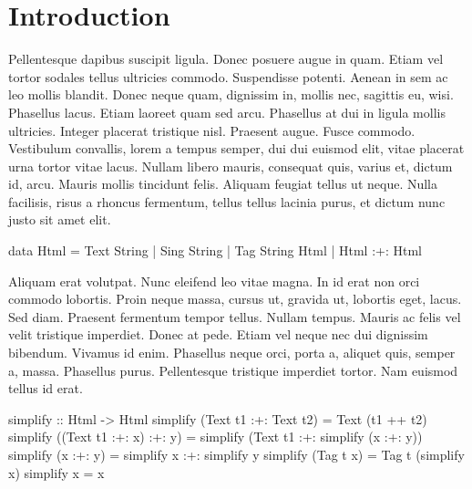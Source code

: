 \section{Introduction}
\label{sec:introduction}

Pellentesque dapibus suscipit ligula. Donec posuere augue in quam. Etiam vel
tortor sodales tellus ultricies commodo. Suspendisse potenti. Aenean in sem ac
leo mollis blandit. Donec neque quam, dignissim in, mollis nec, sagittis eu,
wisi. Phasellus lacus. Etiam laoreet quam sed arcu. Phasellus at dui in ligula
mollis ultricies. Integer placerat tristique nisl. Praesent augue. Fusce
commodo. Vestibulum convallis, lorem a tempus semper, dui dui euismod elit,
vitae placerat urna tortor vitae lacus. Nullam libero mauris, consequat quis,
varius et, dictum id, arcu. Mauris mollis tincidunt felis. Aliquam feugiat
tellus ut neque. Nulla facilisis, risus a rhoncus fermentum, tellus tellus
lacinia purus, et dictum nunc justo sit amet elit.

\begin{code}
data Html
  =  Text  String
  |  Sing  String
  |  Tag   String Html
  |  Html  :+: Html
\end{code}


Aliquam erat volutpat. Nunc eleifend leo vitae magna. In id erat non orci
commodo lobortis. Proin neque massa, cursus ut, gravida ut, lobortis eget,
lacus. Sed diam. Praesent fermentum tempor tellus. Nullam tempus. Mauris ac
felis vel velit tristique imperdiet. Donec at pede. Etiam vel neque nec dui
dignissim bibendum. Vivamus id enim. Phasellus neque orci, porta a, aliquet
quis, semper a, massa. Phasellus purus. Pellentesque tristique imperdiet tortor.
Nam euismod tellus id erat.

\begin{code}
simplify :: Html -> Html
simplify (Text t1 :+: Text t2)
  = Text (t1 ++ t2)
simplify ((Text t1 :+: x) :+: y)
  = simplify (Text t1 :+: simplify (x :+: y))
simplify (x :+: y)
  = simplify x :+: simplify y
simplify (Tag t x)
  = Tag t (simplify x)
simplify x = x
\end{code}

